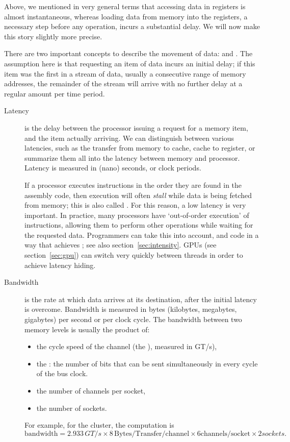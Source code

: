 Above, we mentioned in very general terms that accessing data in
registers is almost instantaneous, whereas loading data from memory
into the registers, a necessary step before any operation, incurs a
substantial delay. We will now make this story slightly more precise.

There are two important concepts to describe the movement of data:
 and . The assumption here is
that requesting an item of data incurs an initial delay; if this item
was the first in a stream of data, usually a consecutive range of
memory addresses, the remainder of the stream will arrive with no
further delay
at a regular amount per time period.
\begin{description}
\item[Latency] is the delay between the processor issuing a request
  for a memory item, and the item actually arriving. We can
  distinguish between various latencies, such as the transfer from
  memory to cache, cache to register, or summarize them all into the
  latency between memory and processor. Latency is measured in (nano)
  seconds, or clock periods.

  If a processor executes instructions in the order they are found in
  the assembly code, then execution will often \emph{stall} while
  data is being fetched from memory; this is also called
  . For this reason, a low latency is very
  important. In practice, many processors have `out-of-order
  execution' of instructions, allowing them to perform other
  operations while waiting for the requested data. Programmers can
  take this into account, and code in a way that achieves
  ; see also section~\ref{sec:intensity}.
  \acp{GPU} (see section~\ref{sec:gpu})  
  can switch very quickly between threads in order to achieve latency hiding.
\item[Bandwidth] is the rate at which data arrives at its destination,
  after the initial latency is overcome. Bandwidth is measured in
  bytes (kilobytes, megabytes, gigabytes) per second or per clock cycle.
  The bandwidth between two memory levels is usually the product of:
  \begin{itemize}
  \item
    the cycle speed of the channel (the ), measured in GT/s),
  \item 
    the : the number of bits that can be sent
    simultaneously in every cycle of the bus clock.
  \item the number of channels per socket,
  \item the number of sockets.
  \end{itemize}
  For example, for the  cluster, the
  computation is
  \[ \mathrm{bandwidth} = 2.933\, GT/s \times 8\, \mathrm{Bytes/Transfer/channel} \times 6 \mathrm{channels/socket} \times 2 sockets. \]
\end{description}

